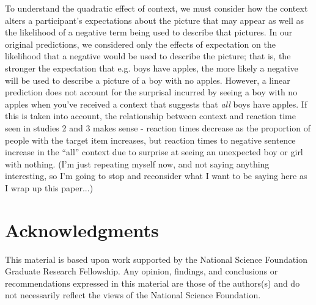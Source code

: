 \documentclass[10pt,letterpaper]{article}
\begin{document}
To understand the quadratic effect of context, we must consider how the context alters a participant's expectations about the picture that may appear as well as the likelihood of a negative term being used to describe that pictures.  In our original predictions, we considered only the effects of expectation on the likelihood that a negative would be used to describe the picture; that is, the stronger the expectation that e.g. boys have apples, the more likely a negative will be used to describe a picture of a boy with no apples.  However, a linear prediction does not account for the surprisal incurred by seeing a boy with no apples when you've received a context that suggests that \emph{all} boys have apples.  If this is taken into account, the relationship between context and reaction time seen in studies 2 and 3 makes sense - reaction times decrease as the proportion of people with the target item increases, but reaction times to negative sentence increase in the ``all'' context due to surprise at seeing an unexpected boy or girl with nothing.  (I'm just repeating myself now, and not saying anything interesting, so I'm going to stop and reconsider what I want to be saying here as I wrap up this paper...)

\section{Acknowledgments}
This material is based upon work supported by the National Science Foundation Graduate Research Fellowship. Any opinion, findings, and conclusions or recommendations expressed in this material are those of the authors(s) and do not necessarily reflect the views of the National Science Foundation.




\setlength{\bibleftmargin}{.125in}
\setlength{\bibindent}{-\bibleftmargin}


\end{document}

